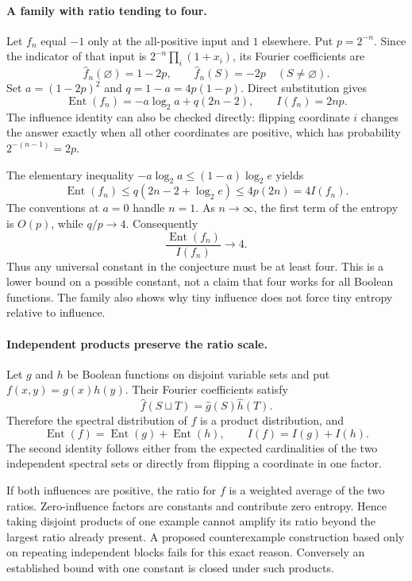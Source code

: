 \documentclass[11pt]{article}
\begin{document}
\paragraph{A family with ratio tending to four.}
Let $f_n$ equal $-1$ only at the all-positive input and $1$ elsewhere. Put $p=2^{-n}$. Since the indicator of that input is
$2^{-n}\prod_i(1+x_i)$, its Fourier coefficients are
\[
 \widehat f_n(\varnothing)=1-2p,\qquad
 \widehat f_n(S)=-2p\quad(S\ne\varnothing).
\]
Set $a=(1-2p)^2$ and $q=1-a=4p(1-p)$. Direct substitution gives
\[
 \operatorname{Ent}(f_n)
   =-a\log_2a+q(2n-2),\qquad
 I(f_n)=2np.
 \tag{412.4}
\]
The influence identity can also be checked directly: flipping coordinate $i$ changes the answer exactly when all other coordinates are positive, which has probability $2^{-(n-1)}=2p$.

The elementary inequality $-a\log_2a\le(1-a)\log_2e$ yields
\[
 \operatorname{Ent}(f_n)
 \le q(2n-2+\log_2e)
 \le 4p(2n)=4I(f_n).
\]
The conventions at $a=0$ handle $n=1$. As $n\to\infty$, the first term of the entropy is $O(p)$, while $q/p\to4$. Consequently
\[
 \frac{\operatorname{Ent}(f_n)}{I(f_n)}\longrightarrow4.
\]
Thus any universal constant in the conjecture must be at least four. This is a lower bound on a possible constant, not a claim that four works for all Boolean functions. The family also shows why tiny influence does not force tiny entropy relative to influence.

\paragraph{Independent products preserve the ratio scale.}
Let $g$ and $h$ be Boolean functions on disjoint variable sets and put $f(x,y)=g(x)h(y)$. Their Fourier coefficients satisfy
\[
 \widehat f(S\sqcup T)=\widehat g(S)\widehat h(T).
\]
Therefore the spectral distribution of $f$ is a product distribution, and
\[
 \operatorname{Ent}(f)=\operatorname{Ent}(g)+\operatorname{Ent}(h),
 \qquad I(f)=I(g)+I(h).
 \tag{412.5}
\]
The second identity follows either from the expected cardinalities of the two independent spectral sets or directly from flipping a coordinate in one factor.

If both influences are positive, the ratio for $f$ is a weighted average of the two ratios. Zero-influence factors are constants and contribute zero entropy. Hence taking disjoint products of one example cannot amplify its ratio beyond the largest ratio already present. A proposed counterexample construction based only on repeating independent blocks fails for this exact reason. Conversely an established bound with one constant is closed under such products.
\end{document}
